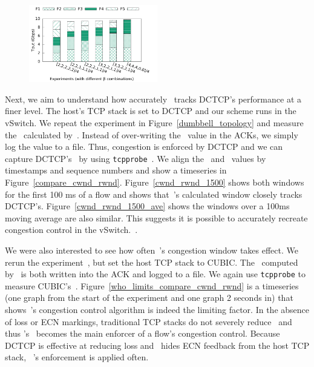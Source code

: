 \begin{figure}[!t]
        \centering
  \includegraphics[width=0.5\textwidth]{acdctcp/figures/qos/qos_stacked.pdf}
        \caption{}
        \label{cc-qos}
\end{figure}

Next, we aim to understand how accurately~\acdc{} tracks DCTCP's performance at a finer level. The host's TCP
stack is set to DCTCP and our scheme runs in the vSwitch.
We repeat the experiment in Figure~\ref{dumbbell_topology} and measure the~\rwnd{} calculated by~\acdc{}. Instead
of over-writing the~\rwnd{} value in the ACKs, we simply log the value to a file. Thus, congestion is enforced by DCTCP
and we can capture DCTCP's~\cwnd{} by using {\tt tcpprobe}~\cite{tcp-probe}. We align the~\rwnd{} and~\cwnd{} values by timestamps and sequence
numbers and show a timeseries in Figure~\ref{compare_cwnd_rwnd}. Figure~\ref{cwnd_rwnd_1500} shows both windows for the
first 100 ms of a flow and shows that~\acdc{}'s calculated window closely tracks DCTCP's. Figure~\ref{cwnd_rwnd_1500_ave} 
shows the windows over a 100ms moving average are also similar. This suggests it is possible to accurately recreate congestion
control in the vSwitch.~.

We were also interested to see how often~\acdc{}'s congestion window takes effect. We rerun the experiment~, but set
the host TCP stack to CUBIC. The~\rwnd{} computed by~\acdc{} is both written into the ACK and logged to a file. We again
use {\tt tcpprobe} to measure CUBIC's~\cwnd{}. Figure~\ref{who_limits_compare_cwnd_rwnd} is a timeseries (one graph from the
start of the experiment and one graph 2 seconds in) that shows~\acdc{}'s
congestion control algorithm is indeed the limiting factor.
In the absence of loss or ECN markings, traditional TCP stacks do not severely reduce~\cwnd{} and thus
\acdc{}'s~\rwnd{} becomes the main enforcer of a flow's congestion control. Because DCTCP 
is effective at reducing loss and~\acdc{} hides ECN feedback from the host TCP stack,
~\acdc{}'s enforcement is applied often.

